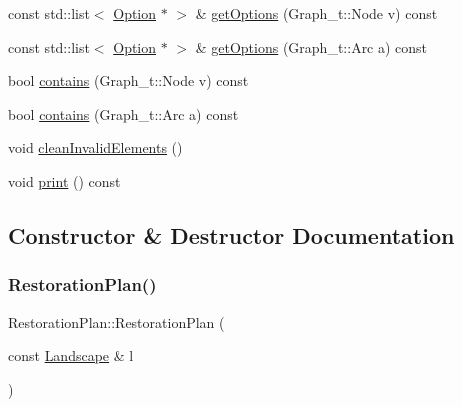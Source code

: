 \begin{DoxyCompactItemize}
const std\+::list$<$ \hyperlink{class_restoration_plan_1_1_option}{Option} $\ast$ $>$ \& \hyperlink{class_restoration_plan_a0c27b60675feb66f08f142d2d090ea7a}{get\+Options} (Graph\+\_\+t\+::\+Node v) const
\item 
const std\+::list$<$ \hyperlink{class_restoration_plan_1_1_option}{Option} $\ast$ $>$ \& \hyperlink{class_restoration_plan_afd0c1f1d3c4a8d951a72500bfe9fa31a}{get\+Options} (Graph\+\_\+t\+::\+Arc a) const
\item 
bool \hyperlink{class_restoration_plan_a719e93c4b00658a3932dd0abf2bdacf1}{contains} (Graph\+\_\+t\+::\+Node v) const
\item 
bool \hyperlink{class_restoration_plan_a6ec10a970b2f6cac43a4dbb66232e457}{contains} (Graph\+\_\+t\+::\+Arc a) const
\item 
void \hyperlink{class_restoration_plan_ab5733bd94e4808886168fe1688636499}{clean\+Invalid\+Elements} ()
\item 
void \hyperlink{class_restoration_plan_ad00a959043a8eb29204700762ce7ae41}{print} () const
\end{DoxyCompactItemize}


\subsection{Constructor \& Destructor Documentation}
\mbox{\label{class_restoration_plan_aef8ef06f5f745bbdd598c1df66c42ca8}} 
\subsubsection{\texorpdfstring{Restoration\+Plan()}{RestorationPlan()}}
{\footnotesize\ttfamily Restoration\+Plan\+::\+Restoration\+Plan (\begin{DoxyParamCaption}\item[{const \hyperlink{class_landscape}{Landscape} \&}]{l }\end{DoxyParamCaption})}

\mbox{\label{class_restoration_plan_ac34ea5df284566db818bebf4de22c5e7}} 
